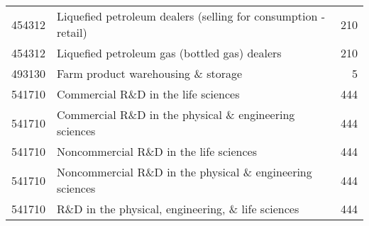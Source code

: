 \begin{tabular}{l | l | r}
454312 & Liquefied petroleum dealers (selling for consumption - retail) & 210 \\
454312 & Liquefied petroleum gas (bottled gas) dealers & 210 \\
493130 & Farm product warehousing \& storage & 5 \\
541710 & Commercial R\&D in the life sciences & 444 \\
541710 & Commercial R\&D in the physical \& engineering sciences & 444 \\
541710 & Noncommercial R\&D in the life sciences & 444 \\
541710 & Noncommercial R\&D in the physical \& engineering sciences & 444 \\
541710 & R\&D in the physical, engineering, \& life sciences & 444 \\
\end{tabular}

\noindent 
